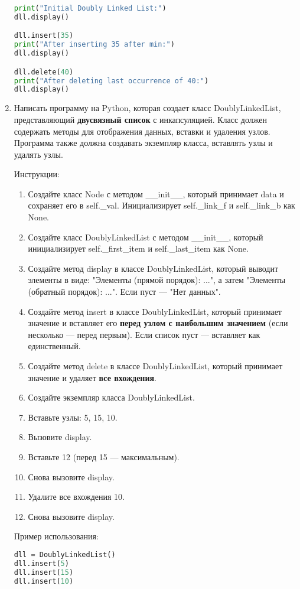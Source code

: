 \begin{enumerate}
\begin{lstlisting}[language=Python]
print("Initial Doubly Linked List:")
dll.display()

dll.insert(35)
print("After inserting 35 after min:")
dll.display()

dll.delete(40)
print("After deleting last occurrence of 40:")
dll.display()
\end{lstlisting}

\item Написать программу на Python, которая создает класс DoublyLinkedList, представляющий \textbf{двусвязный список} с инкапсуляцией. Класс должен содержать методы для отображения данных, вставки и удаления узлов. Программа также должна создавать экземпляр класса, вставлять узлы и удалять узлы.

Инструкции:
\begin{enumerate}
    \item Создайте класс Node с методом \_\_init\_\_, который принимает data и сохраняет его в self.\_val. Инициализирует self.\_link\_f и self.\_link\_b как None.
    \item Создайте класс DoublyLinkedList с методом \_\_init\_\_, который инициализирует self.\_first\_item и self.\_last\_item как None.
    \item Создайте метод display в классе DoublyLinkedList, который выводит элементы в виде: "Элементы (прямой порядок): ...", а затем "Элементы (обратный порядок): ...". Если пуст — "Нет данных".
    \item Создайте метод insert в классе DoublyLinkedList, который принимает значение и вставляет его \textbf{перед узлом с наибольшим значением} (если несколько — перед первым). Если список пуст — вставляет как единственный.
    \item Создайте метод delete в классе DoublyLinkedList, который принимает значение и удаляет \textbf{все вхождения}.
    \item Создайте экземпляр класса DoublyLinkedList.
    \item Вставьте узлы: 5, 15, 10.
    \item Вызовите display.
    \item Вставьте 12 (перед 15 — максимальным).
    \item Снова вызовите display.
    \item Удалите все вхождения 10.
    \item Снова вызовите display.
\end{enumerate}

Пример использования:
\begin{lstlisting}[language=Python]
dll = DoublyLinkedList()
dll.insert(5)
dll.insert(15)
dll.insert(10)


\end{lstlisting}
\end{enumerate}
